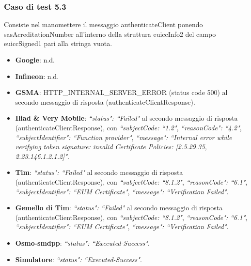 \documentclass[10pt, oneside]{book}
\begin{document}
\subsubsection{Caso di test 5.3}
Consiste nel manomettere il messaggio authenticateClient ponendo sasAcreditationNumber all'interno della struttura euiccInfo2 del campo euiccSigned1 pari alla stringa vuota.
\begin{itemize}
\item \textbf{Google}: n.d.
\item \textbf{Infineon}: n.d.
\item \textbf{GSMA}: HTTP\_INTERNAL\_SERVER\_ERROR (status code 500) al secondo messaggio di risposta (authenticateClientResponse).
\item \textbf{Iliad \& Very Mobile}: \textit{``status": ``Failed"} al secondo messaggio di risposta (authenticateClientResponse), con \textit{``subjectCode: ``1.2"}, \textit{``reasonCode": ``4.2"}, \textit{``subjectIdentifier": ``Function provider"}, \textit{``message": ``Internal error while verifying token signature: invalid Certificate Policies: [2.5.29.35, 2.23.146.1.2.1.2]"}.
\item \textbf{Tim}: \textit{``status": ``Failed"} al secondo messaggio di risposta (authenticateClientResponse), con \textit{``subjectCode: ``8.1.2"}, \textit{``reasonCode": ``6.1"}, \textit{``subjectIdentifier": ``EUM Certificate"}, \textit{``message": ``Verification Failed"}.
\item \textbf{Gemello di Tim}: \textit{``status": ``Failed"} al secondo messaggio di risposta (authenticateClientResponse), con \textit{``subjectCode: ``8.1.2"}, \textit{``reasonCode": ``6.1"}, \textit{``subjectIdentifier": ``EUM Certificate"}, \textit{``message": ``Verification Failed"}.
\item \textbf{Osmo-smdpp}: \textit{``status": ``Executed-Success"}.
\item \textbf{Simulatore}: \textit{``status": ``Executed-Success"}.
\end{itemize}
\end{document}
